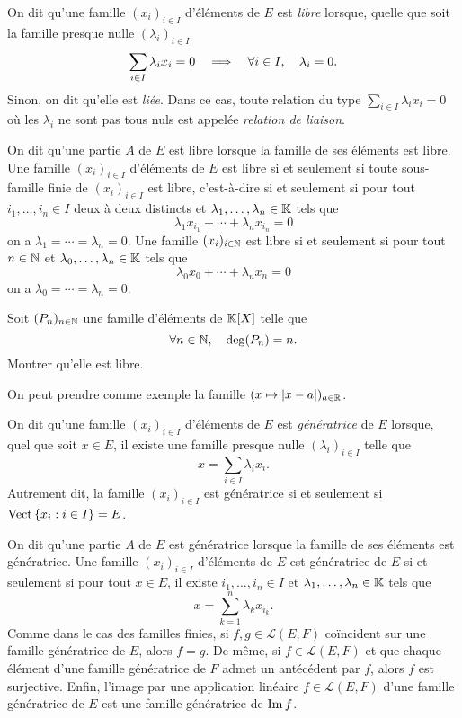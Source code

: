 \documentclass{magnolia}
\begin{document}
\begin{definition}[utile=-3]
On dit qu'une famille $(x_i)_{i\in I}$ d'éléments de $E$ est \emph{libre} lorsque, quelle que soit la famille
presque nulle $(\lambda_i)_{i\in I}$
\[\sum_{i\in I} \lambda_i x_i=0 \quad\Longrightarrow\quad \forall i\in I,\quad \lambda_i=0.\]
Sinon, on dit qu'elle est \emph{liée}. Dans ce cas, toute relation du type
$\sum_{i\in I} \lambda_i x_i=0$ où les $\lambda_i$ ne sont pas tous nuls est appelée \emph{relation de liaison}.
\end{definition}

\begin{remarques}
\remarque On dit qu'une partie $A$ de $E$ est libre lorsque la famille de ses éléments est
  libre.
\remarque Une famille $(x_i)_{i\in I}$ d'éléments de $E$ est libre si et seulement si
  toute sous-famille finie de $(x_i)_{i\in I}$ est libre, c'est-à-dire si et seulement si
  pour tout $i_1,\ldots,i_n\in I$ deux à deux distincts et $\lambda_1,\ldots,\lambda_n\in\mathbb{K}$
  tels que
  \[\lambda_1 x_{i_1}+\cdots+\lambda_n x_{i_n}=0\]
  on a $\lambda_1=\cdots=\lambda_n=0$.
\remarque Une famille $(x_i)_{i\in\mathbb{N}}$ est libre si et seulement si pour tout $n\in\mathbb{N}$
  et $\lambda_0,\ldots,\lambda_n\in\mathbb{K}$ tels que
  \[\lambda_0 x_0+\cdots+\lambda_n x_n=0\]
  on a $\lambda_0=\cdots=\lambda_n=0$.
\end{remarques}

\begin{exoUnique}
\exo Soit $(P_n)_{n\in\mathbb{N}}$ une famille d'éléments de $\polyK$ telle que
\[\forall n\in\mathbb{N},\quad \deg(P_n)=n.\]
Montrer qu'elle est libre.
\end{exoUnique}

\begin{sol}
On peut prendre comme exemple la famille $(x\mapsto |x-a|)_{a\in \mathbb{R}}$.
\end{sol}

\begin{definition}[utile=-3]
On dit qu'une famille $(x_i)_{i\in I}$ d'éléments de $E$ est \emph{génératrice} de $E$ lorsque, quel que soit
$x\in E$, il existe une famille presque nulle $(\lambda_i)_{i\in I}$ telle que
\[x=\sum_{i\in I} \lambda_i x_i.\]
Autrement dit, la famille $(x_i)_{i\in I}$ est génératrice si et seulement si $\operatorname{Vect}\left\{x_i : i\in I\right\}=E$.
\end{definition}

\begin{remarques}
\remarque On dit qu'une partie $A$ de $E$ est génératrice lorsque la famille de ses éléments est génératrice.
\remarque Une famille $(x_i)_{i\in I}$ d'éléments de $E$ est génératrice de $E$ si et
seulement si pour tout $x\in E$, il existe $i_1,\ldots,i_n\in I$ et $\lambda_1,\ldots,\lambda_n\in\mathbb{K}$ tels que
\[x=\sum_{k=1}^n \lambda_k x_{i_k}.\]
\remarque Comme dans le cas des familles finies, si $f,g\in\mathcal{L}(E,F)$ coïncident sur une famille génératrice de
$E$, alors $f=g$. De même, si $f\in\mathcal{L}(E,F)$ et que chaque élément d'une famille génératrice de $F$ admet un antécédent
par $f$, alors $f$ est surjective.
\remarque Enfin, l'image par une application linéaire $f\in\mathcal{L}(E, F)$ d'une famille génératrice de $E$ est une famille
génératrice de $\operatorname{Im} f$.
\end{remarques}
\end{document}
